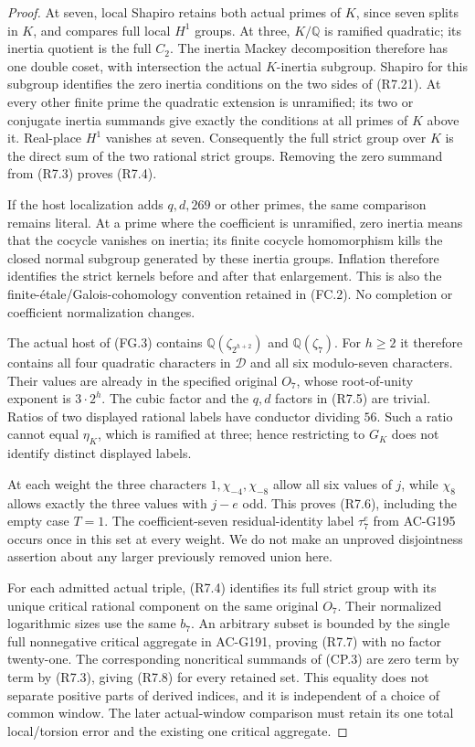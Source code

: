 \begin{proof}
At seven, local Shapiro retains both actual primes of $K$, since
seven splits in $K$, and compares full local $H^1$ groups.
At three, $K/\mathbb Q$ is ramified quadratic; its inertia
quotient is the full $C_2$. The inertia Mackey decomposition
therefore has one double coset, with intersection the actual
$K$-inertia subgroup. Shapiro for this subgroup identifies the
zero inertia conditions on the two sides of (R7.21).
At every other finite prime the quadratic extension is unramified;
its two or conjugate inertia summands give exactly the conditions
at all primes of $K$ above it. Real-place $H^1$ vanishes at seven.
Consequently the full strict group over $K$ is the direct sum
of the two rational strict groups. Removing the zero summand
from (R7.3) proves (R7.4).

If the host localization adds $q,d,269$ or other primes, the same
comparison remains literal. At a prime where the coefficient is
unramified, zero inertia means that the cocycle vanishes on inertia;
its finite cocycle homomorphism kills the closed normal subgroup
generated by these inertia groups. Inflation therefore identifies
the strict kernels before and after that enlargement.
This is also the finite-\'etale/Galois-cohomology convention
retained in (FC.2). No completion or coefficient normalization changes.

The actual host of (FG.3) contains $\mathbb Q(\zeta_{2^{h+2}})$
and $\mathbb Q(\zeta_7)$. For $h\geq2$ it therefore contains
all four quadratic characters in $\mathcal D$ and all six
modulo-seven characters. Their values are already in the
specified original $O_7$, whose root-of-unity exponent is
$3\cdot2^h$. The cubic factor and the $q,d$ factors in (R7.5)
are trivial. Ratios of two displayed rational labels have
conductor dividing $56$. Such a ratio cannot equal $\eta_K$,
which is ramified at three; hence restricting to $G_K$ does
not identify distinct displayed labels.

At each weight the three characters $1,\chi_{-4},\chi_{-8}$
allow all six values of $j$, while $\chi_8$ allows exactly
the three values with $j-e$ odd. This proves (R7.6), including
the empty case $T=1$. The coefficient-seven residual-identity
label $\tau_7^e$ from AC-G195 occurs once in this set at every
weight. We do not make an unproved disjointness assertion about
any larger previously removed union here.

For each admitted actual triple, (R7.4) identifies its full
strict group with its unique critical rational component on
the same original $O_7$. Their normalized logarithmic sizes
use the same $b_7$. An arbitrary subset is bounded by the
single full nonnegative critical aggregate in AC-G191, proving
(R7.7) with no factor twenty-one.
The corresponding noncritical summands of (CP.3) are zero
term by term by (R7.3), giving (R7.8) for every retained set.
This equality does not separate positive parts of derived
indices, and it is independent of a choice of common window.
The later actual-window comparison must retain its one total
local/torsion error and the existing one critical aggregate.
\end{proof}

